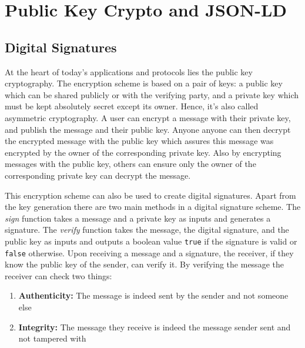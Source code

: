 



\section{Public Key Crypto and JSON-LD}

\subsection{Digital Signatures}

At the heart of today's applications and protocols lies the public key cryptography. The encryption scheme is based on a pair of keys: a public key which can be shared publicly or with the verifying party, and a private key which must be kept absolutely secret except its owner. Hence, it's also called asymmetric cryptography. A user can encrypt a message with their private key, and publish the message and their public key. Anyone anyone can then decrypt the encrypted message with the public key which assures this message was encrypted by the owner of the corresponding private key. Also by encrypting messages with the public key, others can ensure only the owner of the corresponding private key can decrypt the message.

This encryption scheme can also be used to create digital signatures. Apart from the key generation there are two main methods in a digital signature scheme. The \textit{sign} function takes a message and a private key as inputs and generates a signature. The \textit{verify} function takes the message, the digital signature, and the public key as inputs and outputs a boolean value \lstinline{true} if the signature is valid or \lstinline{false} otherwise. Upon receiving a message and a signature, the receiver, if they know the public key of the sender, can verify it. By verifying the message the receiver can check two things:
\begin{enumerate}
    \item \textbf{Authenticity:} The message is indeed sent by the sender and not someone else
    \item \textbf{Integrity:} The message they receive is indeed the message sender sent and not tampered with
\end{enumerate}

